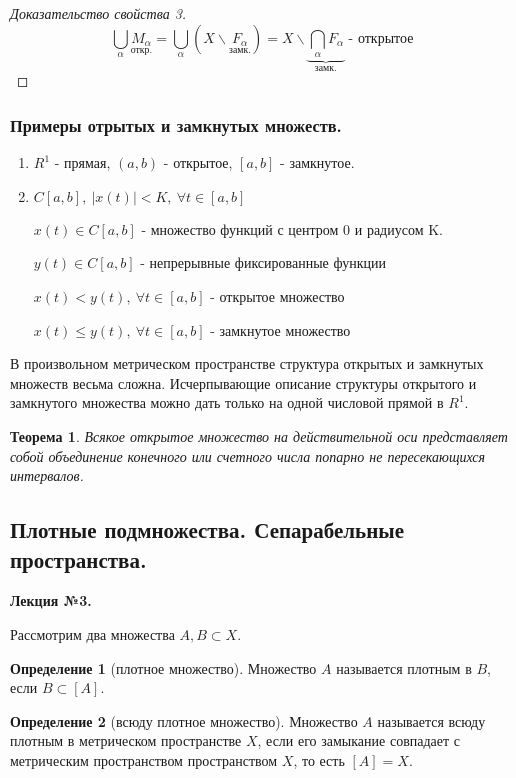 \documentclass[14pt,a4paper]{extarticle}
\newtheorem{theorem}{Теорема}[section]
\theoremstyle{definition}
\newtheorem{definition}{Определение}[section]
\theoremstyle{remark}
\renewcommand{\[}{\begin{dmath*}[compact]}
\renewcommand{\]}{\end{dmath*}}
\newcommand{\be}{\begin{enumerate}}
\newcommand{\ee}{\end{enumerate}}
\newcommand{\sep}{ , \ \allowbreak }
\begin{document}
\begin{proof}[Доказательство свойства 3]
  \[ \bigcup _\alpha \underset{\text{откр.}}{M_\alpha} =
  \bigcup _\alpha\left(X\backslash\underset{\text{замк.}}{F_\alpha} \right) =
  X\backslash \underbrace{\bigcap _\alpha F_\alpha}_{\text{замк.}}
  \text{ - открытое} \]
\end{proof}

\subsubsection{Примеры отрытых и замкнутых множеств.}
\be
  \item $R^1$ - прямая, $(a, b)$ - открытое, $[a, b]$ - замкнутое.

  \item $C[a, b]\sep |x(t)| < K \sep \forall t \in [a, b]$

  $x(t) \in C[a, b]$ - множество функций с центром 0 и радиусом K.

  $y(t) \in C[a, b]$ - непрерывные фиксированные функции

  $x(t) < y(t) \sep \forall t \in [a, b]$ - открытое множество

  $x(t) \leq y(t) \sep \forall t \in [a, b]$ - замкнутое множество
\ee

В произвольном метрическом пространстве структура открытых и замкнутых
множеств весьма сложна.
Исчерпывающие описание структуры открытого и замкнутого множества можно дать
только на одной числовой прямой в $R^1$.

\begin{theorem}
  Всякое открытое множество на действительной оси представляет собой
  объединение конечного или счетного числа попарно не пересекающихся интервалов.
\end{theorem}

\subsection{Плотные подмножества. Сепарабельные пространства.}

\textbf{Лекция №3.}

Рассмотрим два множества $A, B\subset X$.

\begin{definition}[плотное множество]
  Множество $A$ называется плотным в $B$, если $B \subset [A]$.
\end{definition}

\begin{definition}[всюду плотное множество]
  Множество $A$ называется всюду плотным в метрическом
  пространстве $X$, если его замыкание совпадает с метрическим пространством
  пространством $X$, то есть $[A]=X$.
\end{definition}
\end{document}
